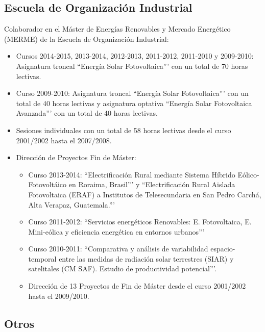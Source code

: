 \documentclass[article, a4paper]{memoir}
\begin{document}
\subsection{Escuela de Organización Industrial}
\label{sec-3-2}

Colaborador en el Máster de Energías Renovables y Mercado Energético (MERME) de la Escuela de Organización Industrial:

\begin{itemize}
\item Cursos 2014-2015, 2013-2014, 2012-2013, 2011-2012, 2011-2010 y 2009-2010: Asignatura troncal ``Energía Solar Fotovoltaica''' con un total de 70 horas lectivas.

\item Curso 2009-2010: Asignatura troncal ``Energía Solar Fotovoltaica''' con un total de 40 horas lectivas y asignatura optativa ``Energía Solar Fotovoltaica Avanzada''' con un total de 40 horas lectivas.

\item Sesiones individuales con un total de 58 horas lectivas desde el curso 2001/2002 hasta el 2007/2008.

\item Dirección de Proyectos Fin de Máster:

\begin{itemize}
\item Curso 2013-2014: ``Electrificación Rural mediante Sistema Híbrido Eólico-Fotovoltáico en Roraima, Brasil''' y ``Electrificación Rural Aislada Fotovoltaica (ERAF) a Institutos de Telesecundaria en San Pedro Carchá, Alta Verapaz, Guatemala.'''
\item Curso 2011-2012: ``Servicios energéticos Renovables: E. Fotovoltaica, E. Mini-eólica y eficiencia energética en entornos urbanos'''
\item Curso 2010-2011: ``Comparativa y análisis de variabilidad espacio-temporal entre las medidas de radiación solar terrestres (SIAR) y satelitales (CM SAF). Estudio de productividad potencial'''.
\item Dirección de 13 Proyectos de Fin de Máster desde el curso 2001/2002 hasta el 2009/2010.
\end{itemize}
\end{itemize}


\subsection{Otros}
\label{sec-3-3}
\end{document}
